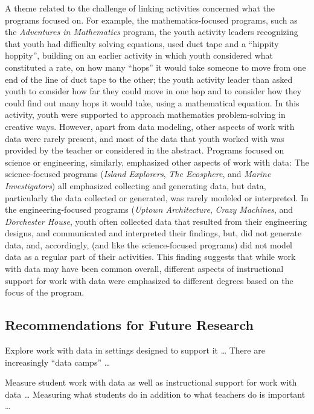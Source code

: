 \documentclass[]{book}
\theoremstyle{definition}
\theoremstyle{definition}
\theoremstyle{definition}
\theoremstyle{remark}
\begin{document}
A theme related to the challenge of linking activities concerned what
the programs focused on. For example, the mathematics-focused programs,
such as the \emph{Adventures in Mathematics} program, the youth activity
leaders recognizing that youth had difficulty solving equations, used
duct tape and a ``hippity hoppity'', building on an earlier activity in
which youth considered what constituted a rate, on how many ``hops'' it
would take someone to move from one end of the line of duct tape to the
other; the youth activity leader than asked youth to consider how far
they could move in one hop and to consider how they could find out many
hops it would take, using a mathematical equation. In this activity,
youth were supported to approach mathematics problem-solving in creative
ways. However, apart from data modeling, other aspects of work with data
were rarely present, and most of the data that youth worked with was
provided by the teacher or considered in the abstract. Programs focused
on science or engineering, similarly, emphasized other aspects of work
with data: The science-focused programs (\emph{Island Explorers},
\emph{The Ecosphere}, and \emph{Marine Investigators}) all emphasized
collecting and generating data, but data, particularly the data
collected or generated, was rarely modeled or interpreted. In the
engineering-focused programs (\emph{Uptown Architecture}, \emph{Crazy
Machines}, and \emph{Dorchester House}, youth often collected data that
resulted from their engineering designs, and communicated and
interpreted their findings, but, did not generate data, and,
accordingly, (and like the science-focused programs) did not model data
as a regular part of their activities. This finding suggests that while
work with data may have been common overall, different aspects of
instructional support for work with data were emphasized to different
degrees based on the focus of the program.

\subsection{Recommendations for Future
Research}\label{recommendations-for-future-research}

Explore work with data in settings designed to support it \ldots{} There
are increasingly ``data camps'' \ldots{}

Measure student work with data as well as instructional support for work
with data \ldots{} Measuring what students do in addition to what
teachers do is important \ldots{}
\end{document}
